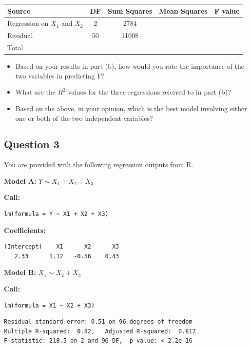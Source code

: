 \begin{center}
\begin{tabular}{|l|c|c|c|c|}
\hline
Source & DF & Sum Squares & Mean Squares & F value \\
\hline
Regression on $X_1$ and $X_2$ & 2 & 2784 & & \\
Residual & 50 & 11008 & & \\
Total & & & & \\
\hline
\end{tabular}
\end{center}

\begin{itemize}
\item[(c)] Based on your results in part (b), how would you rate the importance of the two variables in predicting $Y$?

\item[(d)] What are the $R^2$ values for the three regressions referred to in part (b)?

\item[(e)] Based on the above, in your opinion, which is the best model involving either one or both of the two independent variables?
\end{itemize}

\clearpage

\subsection{Question 3}

You are provided with the following regression outputs from R.

\textbf{Model A:} $Y \sim X_1 + X_2 + X_3$

\textbf{Call:}
\begin{verbatim}
lm(formula = Y ~ X1 + X2 + X3)
\end{verbatim}

\textbf{Coefficients:}
\begin{verbatim}
(Intercept)    X1      X2      X3
   2.33      1.12   -0.56    0.43
\end{verbatim}

\textbf{Model B:} $X_1 \sim X_2 + X_3$

\textbf{Call:}
\begin{verbatim}
lm(formula = X1 ~ X2 + X3)
\end{verbatim}

\begin{verbatim}
Residual standard error: 0.51 on 96 degrees of freedom
Multiple R-squared:  0.82,   Adjusted R-squared:  0.817
F-statistic: 218.5 on 2 and 96 DF,  p-value: < 2.2e-16
\end{verbatim}

